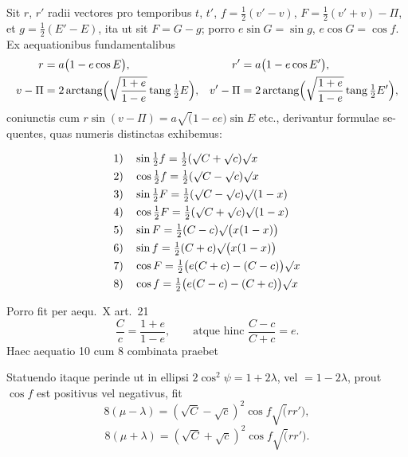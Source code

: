 \documentclass[12pt,a4paper]{article}
\newcommand{\tang}{\mathop{\mathrm{tang}}\nolimits}
\DeclareMathOperator{\arctang}{arctang}
\begin{document}
Sit $r$, $r'$ radii vectores pro temporibus $t$, $t'$, $f = \tfrac{1}{2}(v' - v)$, $F = \tfrac{1}{2}(v' + v) - \Pi$,
et $g = \tfrac{1}{2}(E' - E)$, ita ut sit $F = G - g$; porro $e\sin G = \sin g$, $e\cos G = \cos f$.
Ex aequationibus fundamentalibus
\begin{align*}
r &= a\bigl(1 - e\cos E\bigr), & r' &= a\bigl(1 - e\cos E'\bigr), \\
v - \Pi &= 2\arctang\Bigl(\sqrt{\frac{1 + e}{1 - e}}\tang\tfrac{1}{2}E\Bigr), &
v' - \Pi &= 2\arctang\Bigl(\sqrt{\frac{1 + e}{1 - e}}\tang\tfrac{1}{2}E'\Bigr),
\end{align*}
coniunctis cum $r\sin(v - \Pi) = a\surd(1 - ee)\sin E$ etc., derivantur formulae se-
quentes, quas numeris distinctas exhibemus:

\begin{align*}
\text{1)}\quad & \sin\tfrac{1}{2}f = \tfrac{1}{2}(\surd C + \surd c)\surd x \\
\text{2)}\quad & \cos\tfrac{1}{2}f = \tfrac{1}{2}(\surd C - \surd c)\surd x \\
\text{3)}\quad & \sin\tfrac{1}{2}F = \tfrac{1}{2}(\surd C - \surd c)\surd(1 - x) \\
\text{4)}\quad & \cos\tfrac{1}{2}F = \tfrac{1}{2}(\surd C + \surd c)\surd(1 - x) \\
\text{5)}\quad & \sin F = \tfrac{1}{2}(C - c)\surd\bigl(x(1 - x)\bigr) \\
\text{6)}\quad & \sin f = \tfrac{1}{2}(C + c)\surd\bigl(x(1 - x)\bigr) \\
\text{7)}\quad & \cos F = \tfrac{1}{2}\bigl(e(C + c) - (C - c)\bigr)\surd x \\
\text{8)}\quad & \cos f = \tfrac{1}{2}\bigl(e(C - c) - (C + c)\bigr)\surd x
\end{align*}

Porro fit per aequ.~X art.~21
\[
\frac{C}{c} = \frac{1 + e}{1 - e}, \qquad \text{atque hinc } \frac{C - c}{C + c} = e.
\]
Haec aequatio 10 cum 8 combinata praebet

Statuendo itaque perinde ut in ellipsi $2\cos^2\psi = 1 + 2\lambda$, vel $= 1 - 2\lambda$,
prout $\cos f$ est positivus vel negativus, fit
\begin{equation}\tag{12}
8(\mu - \lambda) = (\surd C - \surd c)^2\cos f\surd(rr'),
\end{equation}
\begin{equation}\tag{12*}
8(\mu + \lambda) = (\surd C + \surd c)^2\cos f\surd(rr').
\end{equation}
\end{document}

